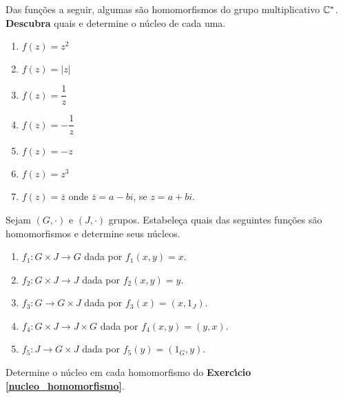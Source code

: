 \documentclass[12pt]{exam}
\begin{document}
    \questao{} Das funções a seguir, algumas são homomorfismos do grupo multiplicativo $\mathbb{C}^*$. \textbf{Descubra} quais e determine o núcleo de cada uma.
    \begin{multicols}{2}
      \begin{enumerate}[label=({\alph*})]
        \item $f(z) = z^2$

        \item $f(z) = |z|$

        \item $f(z) = \dfrac{1}{z}$

        \item $f(z) = -\dfrac{1}{z}$

        \item $f(z) = -z$

        \item $f(z) = z^3$

        \item $f(z) = \overline{z}$ onde $\overline{z} = a - bi$, se $z = a + bi$.
      \end{enumerate}
    \end{multicols}

    \vspace{.3cm}

    \questao{} Sejam $(G, \cdot)$ e $(J, \cdot)$ grupos. Estabeleça quais das seguintes funções são homomorfismos e determine seus núcleos.

    \begin{enumerate}[label=({\alph*})]
      \item $f_1 : G \times J \to G$ dada por $f_1(x,y) = x$.

      \item $f_2 : G \times J \to J$ dada por $f_2(x,y) = y$.

      \item $f_3 : G  \to G \times J$ dada por $f_3(x) = (x, 1_J)$.

      \item $f_4 : G \times J \to J \times G$ dada por $f_4(x,y) = (y, x)$.

      \item $f_5 : J \to G \times J$ dada por $f_5(y) = (1_G, y)$.
    \end{enumerate}

    \vspace{.3cm}

    \questao{} Determine o n\'ucleo em cada homomorfismo do \textbf{Exerc{\'\i}cio \ref{nucleo_homomorfismo}}.
\end{document}
